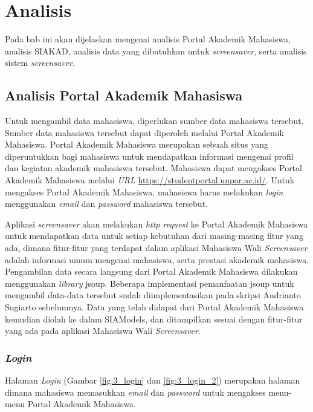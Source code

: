\chapter{Analisis}
\label{chap:analisis}

Pada bab ini akan dijelaskan mengenai analisis Portal Akademik Mahasiswa, analisis SIAKAD, analisis data yang dibutuhkan untuk \textit{screensaver}, serta analisis sistem \textit{screensaver}.

\section{Analisis Portal Akademik Mahasiswa}
\label{analisisPemanfaatanJsoup}
Untuk mengambil data mahasiswa, diperlukan sumber data mahasiswa tersebut. Sumber data mahasiswa tersebut dapat diperoleh melalui Portal Akademik Mahasiswa. Portal Akademik Mahasiswa merupakan sebuah situs yang diperuntukkan bagi mahasiswa untuk mendapatkan informasi mengenai profil dan kegiatan akademik mahasiswa tersebut. Mahasiswa dapat mengakses Portal Akademik Mahasiswa melalui \textit{URL} \url{https://studentportal.unpar.ac.id/}. Untuk mengakses Portal Akademik Mahasiswa, mahasiswa harus melakukan \textit{login} menggunakan \textit{email} dan \textit{password} mahasiswa tersebut.

Aplikasi \textit{screensaver} akan melakukan \textit{http request} ke Portal Akademik Mahasiswa untuk mendapatkan data untuk setiap kebutuhan dari masing-masing fitur yang ada, dimana fitur-fitur yang terdapat dalam aplikasi Mahasiswa Wali \textit{Screensaver} adalah informasi umum mengenai mahasiswa, serta prestasi akademik mahasiswa. Pengambilan data secara langsung dari Portal Akademik Mahasiswa dilakukan menggunakan \textit{library} jsoup. Beberapa implementasi pemanfaatan jsoup untuk mengambil data-data tersebut sudah diimplementasikan pada skripsi Andrianto Sugiarto \cite{ifstupor} sebelumnya. Data yang telah didapat dari Portal Akademik Mahasiswa kemudian diolah ke dalam SIAModels, dan ditampilkan sesuai dengan fitur-fitur yang ada pada aplikasi Mahasiswa Wali \textit{Screensaver}.


\subsection{\textit{Login}}
Halaman \textit{Login} (Gambar \ref{fig:3_login} dan \ref{fig:3_login_2}) merupakan halaman dimana mahasiswa memasukkan \textit{email} dan \textit{password} untuk mengakses menu-menu Portal Akademik Mahasiswa.

